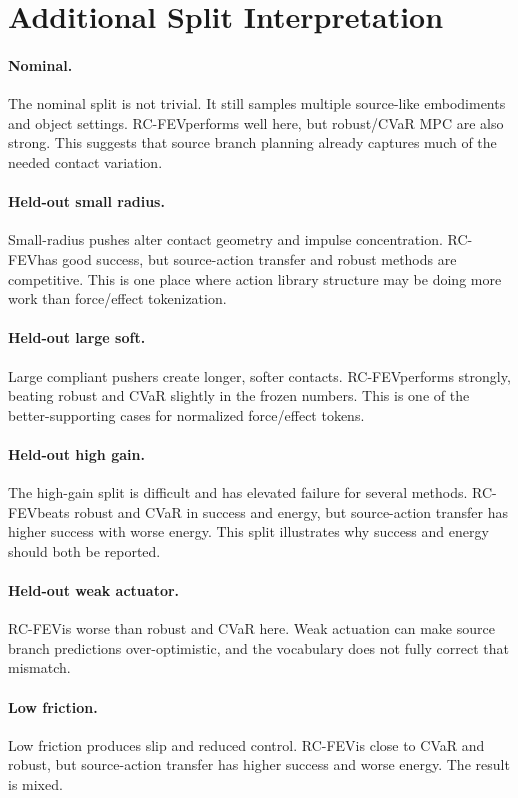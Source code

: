 \documentclass{article}
\newcommand{\method}{RC-FEV}
\begin{document}
\section{Additional Split Interpretation}

\paragraph{Nominal.}
The nominal split is not trivial. It still samples multiple source-like embodiments and object settings. \method performs well here, but robust/CVaR MPC are also strong. This suggests that source branch planning already captures much of the needed contact variation.

\paragraph{Held-out small radius.}
Small-radius pushes alter contact geometry and impulse concentration. \method has good success, but source-action transfer and robust methods are competitive. This is one place where action library structure may be doing more work than force/effect tokenization.

\paragraph{Held-out large soft.}
Large compliant pushers create longer, softer contacts. \method performs strongly, beating robust and CVaR slightly in the frozen numbers. This is one of the better-supporting cases for normalized force/effect tokens.

\paragraph{Held-out high gain.}
The high-gain split is difficult and has elevated failure for several methods. \method beats robust and CVaR in success and energy, but source-action transfer has higher success with worse energy. This split illustrates why success and energy should both be reported.

\paragraph{Held-out weak actuator.}
\method is worse than robust and CVaR here. Weak actuation can make source branch predictions over-optimistic, and the vocabulary does not fully correct that mismatch.

\paragraph{Low friction.}
Low friction produces slip and reduced control. \method is close to CVaR and robust, but source-action transfer has higher success and worse energy. The result is mixed.
\end{document}
